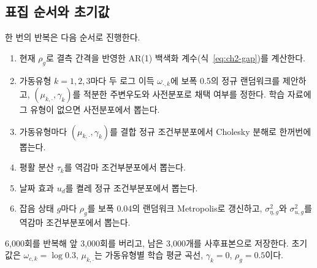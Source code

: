 \subsection{표집 순서와 초기값}

한 번의 반복은 다음 순서로 진행한다.
\begin{enumerate}
\item 현재 $\rho_g$로 결측 간격을 반영한 AR(1) 백색화 계수(식~\ref{eq:ch2-gap})를 계산한다.
\item 가동유형 $k=1,2,3$마다 두 로그 이득 $\omega_{\cdot,k}$에 보폭 0.5의 정규 랜덤워크를 제안하고, $(\mu_{k,\cdot},\gamma_k)$를 적분한 주변우도와 사전분포로 채택 여부를 정한다. 학습 자료에 그 유형이 없으면 사전분포에서 뽑는다.
\item 가동유형마다 $(\mu_{k,\cdot},\gamma_k)$를 결합 정규 조건부분포에서 Cholesky 분해로 한꺼번에 뽑는다.
\item 평활 분산 $\tau_k$를 역감마 조건부분포에서 뽑는다.
\item 날짜 효과 $u_d$를 켤레 정규 조건부분포에서 뽑는다.
\item 잡음 상태 $g$마다 $\rho_g$를 보폭 0.04의 랜덤워크 Metropolis로 갱신하고, $\sigma^2_{\eta,g}$와 $\sigma^2_{u,g}$를 역감마 조건부분포에서 뽑는다.
\end{enumerate}
6,000회를 반복해 앞 3,000회를 버리고, 남은 3,000개를 사후표본으로 저장한다. 초기값은 $\omega_{c,k}=\log0.3$, $\mu_{k,\cdot}$는 가동유형별 학습 평균 곡선, $\gamma_k=0$, $\rho_g=0.5$이다.
